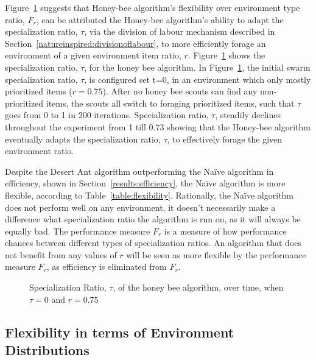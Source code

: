 Figure~\ref{fig:specializationratioovertime} suggests that Honey-bee algorithm's flexibility over environment type ratio, $F_r$, can be attributed the Honey-bee algorithm's ability to adapt the specialization ratio, $\tau$, via the division of labour mechanism described in Section~\ref{natureinspired:divisionoflabour}, to more efficiently forage an environment of a given environment item ratio, $r$. Figure~\ref{fig:specializationratioovertime} shows the specialization ratio, $\tau$, for the honey bee algorithm. In Figure~\ref{fig:specializationratioovertime}, the initial swarm specialization ratio, $\tau$, is configured set t=0, in an environment which only mostly prioritized items ($r=0.75$). After no honey bee scouts can find any non-prioritized items, the scouts all switch to foraging prioritized items, such that $\tau$ goes from 0 to 1 in 200 iterations. Specialization ratio, $\tau$, steadily declines throughout the experiment from 1 till 0.73 showing that the Honey-bee algorithm eventually adapts the specialization ratio, $\tau$, to effectively forage the given environment ratio. 

Despite the Desert Ant algorithm outperforming the Na\"ive algorithm in efficiency, shown in Section~\ref{results:efficiency}, the Na\"ive algorithm is more flexible, according to Table~\ref{table:flexibility}. Rationally, the Na\"ive algorithm does not perform well on any environment, it doesn't necessarily make a difference what specialization ratio the algorithm is run on, as it will always be equally bad. The performance measure $F_r$ is a measure of how performance chances between different types of specialization ratios. An algorithm that does not benefit from any values of $r$ will be seen as more flexible by the performance measure $F_r$, as efficiency is eliminated from $F_r$.

\begin{figure}[!htb]
\centering
\resizebox{\textwidth}{!}{}
\caption{Specialization Ratio, $\tau$, of the honey bee algorithm, over time, when $\tau=0$ and $r=0.75$}
\label{fig:specializationratioovertime}
\end{figure}


\subsection{Flexibility in terms of Environment Distributions}
\label{results:flexibility:environmentdistribution}

